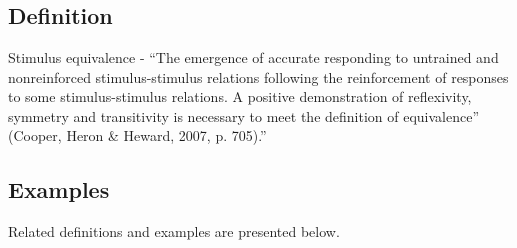 \clearpage \section{\fourFKTwelve{}}
\subsection{Definition}
Stimulus equivalence - ``The emergence of accurate responding to untrained and nonreinforced stimulus-stimulus relations following the reinforcement of responses to some stimulus-stimulus relations. A positive demonstration of reflexivity, symmetry and transitivity is necessary to meet the definition of equivalence'' (Cooper, Heron \& Heward, 2007, p. 705).'' 

\subsection{Examples}
Related definitions and examples are presented below.
